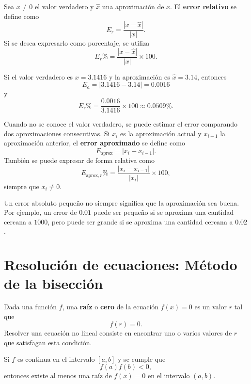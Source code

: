 \documentclass[a4,11pt]{aleph-notas}
\begin{document}
\begin{defi}
    Sea $x \neq 0$ el valor verdadero y $\widehat{x}$ una aproximación de $x$. El \textbf{error relativo} se define como
    \[
        E_r = \frac{|x-\widehat{x}|}{|x|}.
    \]
    Si se desea expresarlo como porcentaje, se utiliza
    \[
        E_r\% = \frac{|x-\widehat{x}|}{|x|}\times 100.
    \]
\end{defi}

\begin{ejem}
    Si el valor verdadero es $x=3.1416$ y la aproximación es $\widehat{x}=3.14$, entonces
    \[
        E_a = |3.1416-3.14| = 0.0016
    \]
    y
    \[
        E_r\% = \frac{0.0016}{3.1416}\times 100 \approx 0.0509\%.
    \]
\end{ejem}

\begin{defi}
    Cuando no se conoce el valor verdadero, se puede estimar el error comparando dos aproximaciones consecutivas. Si $x_i$ es la aproximación actual y $x_{i-1}$ la aproximación anterior, el \textbf{error aproximado} se define como
    \[
        E_{\text{aprox}} = |x_i-x_{i-1}|.
    \]
    También se puede expresar de forma relativa como
    \[
        E_{\text{aprox},r}\% = \frac{|x_i-x_{i-1}|}{|x_i|}\times 100,
    \]
    siempre que $x_i \neq 0$.
\end{defi}

\begin{advertencia}
    Un error absoluto pequeño no siempre significa que la aproximación sea buena. Por ejemplo, un error de $0.01$ puede ser pequeño si se aproxima una cantidad cercana a $1000$, pero puede ser grande si se aproxima una cantidad cercana a $0.02$.
\end{advertencia}

\section{Resolución de ecuaciones: Método de la bisección}

\begin{defi}
    Dada una función $f$, una \textbf{raíz} o \textbf{cero} de la ecuación $f(x)=0$ es un valor $r$ tal que
    \[
        f(r)=0.
    \]
    Resolver una ecuación no lineal consiste en encontrar uno o varios valores de $r$ que satisfagan esta condición.
\end{defi}

\begin{teo}
    Si $f$ es continua en el intervalo $[a,b]$ y se cumple que
    \[
        f(a)f(b)<0,
    \]
    entonces existe al menos una raíz de $f(x)=0$ en el intervalo $(a,b)$.
\end{teo}
\end{document}
